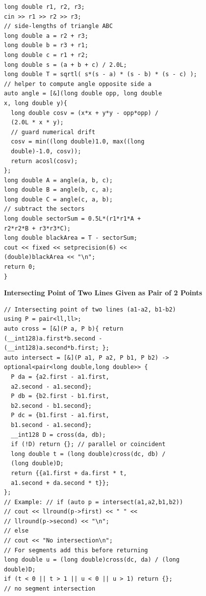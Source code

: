 \begin{lstlisting}
long double r1, r2, r3;
cin >> r1 >> r2 >> r3;
// side-lengths of triangle ABC
long double a = r2 + r3;
long double b = r3 + r1;
long double c = r1 + r2;
long double s = (a + b + c) / 2.0L;
long double T = sqrtl( s*(s - a) * (s - b) * (s - c) );
// helper to compute angle opposite side a
auto angle = [&](long double opp, long double
x, long double y){
  long double cosv = (x*x + y*y - opp*opp) /
  (2.0L * x * y);
  // guard numerical drift
  cosv = min((long double)1.0, max((long
  double)-1.0, cosv));
  return acosl(cosv);
};
long double A = angle(a, b, c);
long double B = angle(b, c, a);
long double C = angle(c, a, b);
// subtract the sectors
long double sectorSum = 0.5L*(r1*r1*A +
r2*r2*B + r3*r3*C);
long double blackArea = T - sectorSum;
cout << fixed << setprecision(6) <<
(double)blackArea << "\n";
return 0;
}
\end{lstlisting}

\textbf{Intersecting Point of Two Lines Given as Pair of 2 Points}
\begin{lstlisting}
// Intersecting point of two lines (a1-a2, b1-b2)
using P = pair<ll,ll>;
auto cross = [&](P a, P b){ return
(__int128)a.first*b.second -
(__int128)a.second*b.first; };
auto intersect = [&](P a1, P a2, P b1, P b2) ->
optional<pair<long double,long double>> {
  P da = {a2.first - a1.first,
  a2.second - a1.second};
  P db = {b2.first - b1.first,
  b2.second - b1.second};
  P dc = {b1.first - a1.first,
  b1.second - a1.second};
  __int128 D = cross(da, db);
  if (!D) return {}; // parallel or coincident
  long double t = (long double)cross(dc, db) /
  (long double)D;
  return {{a1.first + da.first * t,
  a1.second + da.second * t}};
};
// Example: // if (auto p = intersect(a1,a2,b1,b2))
// cout << llround(p->first) << " " <<
// llround(p->second) << "\n";
// else
// cout << "No intersection\n";
// For segments add this before returning
long double u = (long double)cross(dc, da) / (long
double)D;
if (t < 0 || t > 1 || u < 0 || u > 1) return {};
// no segment intersection
\end{lstlisting}

